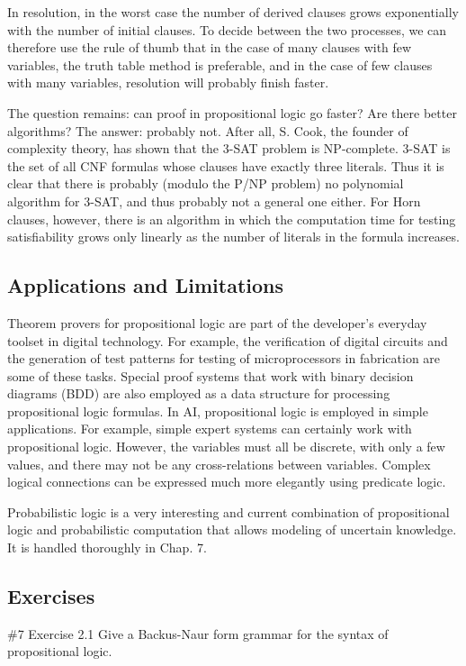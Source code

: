 \documentclass[10pt]{book}
\begin{document}
In resolution, in the worst case the number of derived clauses grows exponentially with the number of initial clauses. To decide between the two processes, we can therefore use the rule of thumb that in the case of many clauses with few variables, the truth table method is preferable, and in the case of few clauses with many variables, resolution will probably finish faster.

The question remains: can proof in propositional logic go faster? Are there better algorithms? The answer: probably not. After all, S. Cook, the founder of complexity theory, has shown that the 3-SAT problem is NP-complete. 3-SAT is the set of all CNF formulas whose clauses have exactly three literals. Thus it is clear that there is probably (modulo the P/NP problem) no polynomial algorithm for 3-SAT, and thus probably not a general one either. For Horn clauses, however, there is an algorithm in which the computation time for testing satisfiability grows only linearly as the number of literals in the formula increases.

\subsection{Applications and Limitations}
Theorem provers for propositional logic are part of the developer's everyday toolset in digital technology. For example, the verification of digital circuits and the generation of test patterns for testing of microprocessors in fabrication are some of these tasks. Special proof systems that work with binary decision diagrams (BDD) are also employed as a data structure for processing propositional logic formulas.
In AI, propositional logic is employed in simple applications. For example, simple expert systems can certainly work with propositional logic. However, the variables must all be discrete, with only a few values, and there may not be any cross-relations between variables. Complex logical connections can be expressed much more elegantly using predicate logic.

Probabilistic logic is a very interesting and current combination of propositional logic and probabilistic computation that allows modeling of uncertain knowledge. It is handled thoroughly in Chap. 7.

\subsection{Exercises}
\#7 Exercise 2.1 Give a Backus-Naur form grammar for the syntax of propositional logic.
\end{document}
